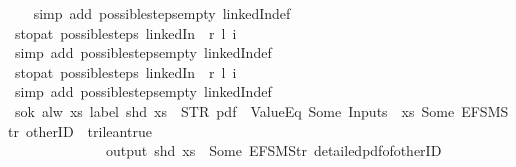 \begin{isabellebody}
%
\isadelimproof
\ \ %
\endisadelimproof
%
\isatagproof
{}\isamarkupfalse%
\ {\isacharparenleft}simp\ add{\isacharcolon}\ possible{\isacharunderscore}steps{\isacharunderscore}empty\ linkedIn{\isacharunderscore}def{\isacharparenright}%
\endisatagproof
{\isafoldproof}%
%
\isadelimproof
\isanewline
%
\endisadelimproof
\isanewline
{}\isamarkupfalse%
\ stop{\isacharunderscore}at{\isacharunderscore}{}{\isacharcolon}\ {\isachardoublequoteopen}possible{\isacharunderscore}steps\ linkedIn\ {}\ r\ l\ i\ {\isacharequal}\ {\isacharbraceleft}{\isacharbar}{\isacharbar}{\isacharbraceright}{\isachardoublequoteclose}\isanewline
%
\isadelimproof
\ \ %
\endisadelimproof
%
\isatagproof
{}\isamarkupfalse%
\ {\isacharparenleft}simp\ add{\isacharcolon}\ possible{\isacharunderscore}steps{\isacharunderscore}empty\ linkedIn{\isacharunderscore}def{\isacharparenright}%
\endisatagproof
{\isafoldproof}%
%
\isadelimproof
\isanewline
%
\endisadelimproof
\isanewline
{}\isamarkupfalse%
\ stop{\isacharunderscore}at{\isacharunderscore}{}{\isacharcolon}\ {\isachardoublequoteopen}possible{\isacharunderscore}steps\ linkedIn\ {}\ r\ l\ i\ {\isacharequal}\ {\isacharbraceleft}{\isacharbar}{\isacharbar}{\isacharbraceright}{\isachardoublequoteclose}\isanewline
%
\isadelimproof
\ \ %
\endisadelimproof
%
\isatagproof
{}\isamarkupfalse%
\ {\isacharparenleft}simp\ add{\isacharcolon}\ possible{\isacharunderscore}steps{\isacharunderscore}empty\ linkedIn{\isacharunderscore}def{\isacharparenright}%
\endisatagproof
{\isafoldproof}%
%
\isadelimproof
\isanewline
%
\endisadelimproof
\isanewline
{}\isamarkupfalse%
\ s{}{\isacharunderscore}ok{\isacharcolon}\ {\isachardoublequoteopen}alw\ {\isacharparenleft}{\isasymlambda}xs{\isachardot}\ label\ {\isacharparenleft}shd\ xs{\isacharparenright}\ {\isacharequal}\ STR\ {\isacharprime}{\isacharprime}pdf{\isacharprime}{\isacharprime}\ {\isasymand}\ ValueEq\ {\isacharparenleft}Some\ {\isacharparenleft}Inputs\ {}\ xs{\isacharparenright}{\isacharparenright}\ {\isacharparenleft}Some\ {\isacharparenleft}EFSM{\isachardot}Str\ {\isacharprime}{\isacharprime}otherID{\isacharprime}{\isacharprime}{\isacharparenright}{\isacharparenright}\ {\isacharequal}\ trilean{\isachardot}true\ {\isasymlongrightarrow}\isanewline
\ \ \ \ \ \ \ \ \ \ \ \ \ \ output\ {\isacharparenleft}shd\ xs{\isacharparenright}\ {\isasymnoteq}\ {\isacharbrackleft}Some\ {\isacharparenleft}EFSM{\isachardot}Str\ {\isacharprime}{\isacharprime}detailed{\isacharunderscore}pdf{\isacharunderscore}of{\isacharunderscore}otherID{\isacharprime}{\isacharprime}{\isacharparenright}{\isacharbrackright}{\isacharparenright}\isanewline

\end{isabellebody}
